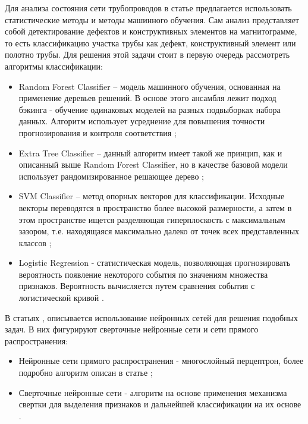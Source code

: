 \documentclass[a4paper,article,14pt]{extarticle}
\begin{document}
\pagebreak


Для анализа состояния сети трубопроводов в статье \cite{a2} предлагается использовать 
статистические методы и методы машинного обучения. Сам анализ представляет собой детектирование дефектов и 
конструктивных элементов на магнитограмме, то есть классификацию участка трубы как дефект, конструктивный 
элемент или полотно трубы. Для решения этой задачи стоит в первую очередь рассмотреть алгоритмы классификации:

\begin{itemize}
    \item Random Forest Classifier – модель машинного обучения, основанная на применение деревьев решений. В основе этого ансамбля лежит подход бэкинга - обучение одинаковых моделей на разных подвыборках набора данных. Алгоритм использует усреднение для повышения точности прогнозирования и контроля соответствия \cite{a3};
    \item Extra Tree Classifier – данный алгоритм имеет такой же принцип, как и описанный выше Random Forest Classifier, но в качестве базовой модели использует рандомизированное решающее дерево \cite{a4};
    \item SVM Classifier – метод опорных векторов для классификации. Исходные векторы переводятся в пространство более высокой размерности, а затем в этом пространстве ищется разделяющая гиперплоскость с максимальным зазором, т.е. находящаяся максимально далеко от точек всех представленных классов \cite{a5};
    \item Logistic Regression - статистическая модель, позволяющая прогнозировать вероятность появление некоторого события по значениям множества признаков. Вероятность вычисляется путем сравнения события с логистической кривой \cite{a6}.
\end{itemize}

В статьях  \cite{a7}, \cite{a8} описывается использование нейронных сетей для решения подобных задач. В них фигурируют сверточные нейронные сети и сети прямого распространения:

\begin{itemize}
    \item Нейронные сети прямого распространения - многослойный перцептрон, более подробно алгоритм описан в статье \cite{a9};
    \item Сверточные нейронные сети - алгоритм на основе применения механизма свертки для выделения
    признаков и дальнейшей классификации на их основе \cite{a10}.
\end{itemize}
\end{document}

